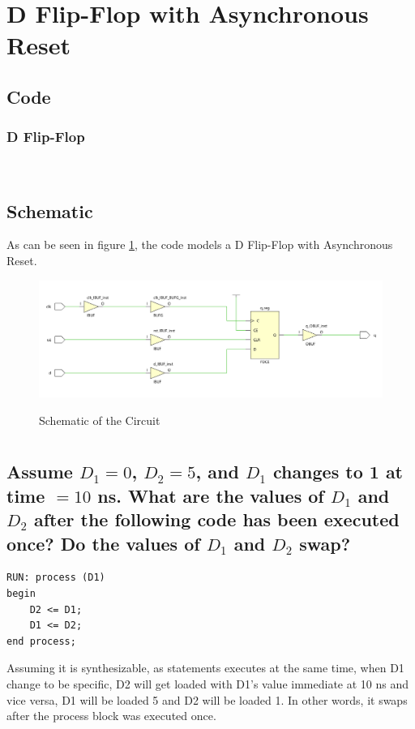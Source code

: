 \documentclass{article}
\begin{document}
\newpage

\section{D Flip-Flop with Asynchronous Reset}
\subsection*{Code}
\subsubsection*{D Flip-Flop}

\;\\
\subsection*{Schematic}
As can be seen in figure \ref{fig:2_sch}, the code models a D Flip-Flop with Asynchronous Reset.
\begin{figure}[H]
  \centering
  \caption{Schematic of the Circuit}
  \includegraphics[width=\textwidth]{ECE4304_Midterm2_2_sch.png}
  \label{fig:2_sch}
\end{figure}

\newpage

\section{}
\subsection{Assume $D_1 = 0$, $D_2 = 5$, and $D_1$ changes to 1 at time $= 10$ ns. What are the values of $D_1$ and $D_2$ after the following code has been executed once? Do the values of $D_1$ and $D_2$ swap?}
\begin{lstlisting}[style=VHDL]
RUN: process (D1)
begin 
    D2 <= D1; 
    D1 <= D2;   
end process;
\end{lstlisting}
Assuming it is synthesizable, as statements executes at the same time, when D1 change to be specific, D2 will get loaded with D1's value immediate at 10 ns and vice versa, D1 will be loaded 5 and D2 will be loaded 1.
In other words, it swaps after the process block was executed once.
\end{document}
